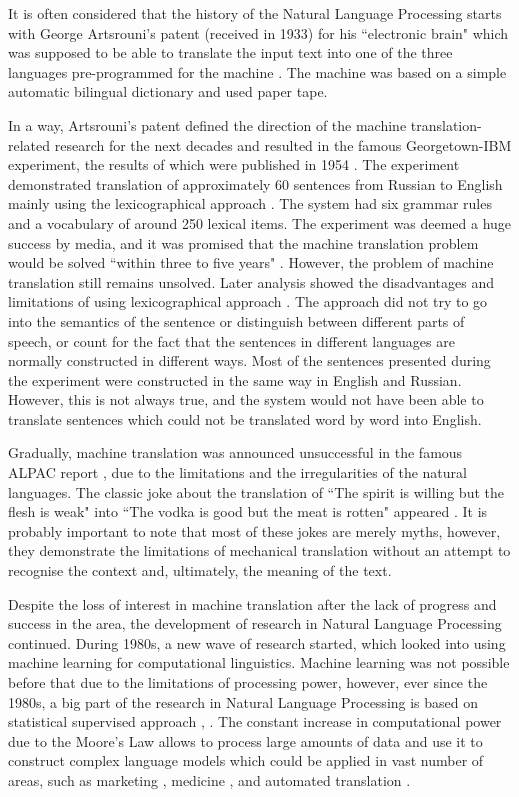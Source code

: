 It is often considered that the history of the Natural Language Processing starts with George Artsrouni's patent (received in 1933) for his ``electronic brain" which was supposed to be able to translate the input text into one of the three languages pre-programmed for the machine \cite{hutchins2004two}. The machine was based on a simple automatic bilingual dictionary and used paper tape. 

In a way, Artsrouni's patent defined the direction of the machine translation-related research for the next decades and resulted in the famous Georgetown-IBM experiment, the results of which were published in 1954 \cite{dostert1955georgetown}. The experiment demonstrated translation of approximately 60 sentences from Russian to English mainly using the lexicographical approach \cite{hutchins2004georgetown}. The system had six grammar rules and a vocabulary of around 250 lexical items. The experiment was deemed a huge success by media, and it was promised that the machine translation problem would be solved ``within three to five years" \cite{plumb1954russian}. However, the problem of machine translation still remains unsolved. Later analysis showed the disadvantages and limitations of using lexicographical approach \cite{garvin1968georgetown}. The approach did not try to go into the semantics of the sentence or distinguish between different parts of speech, or count for the fact that the sentences in different languages are normally constructed in different ways. Most of the sentences presented during the experiment were constructed in the same way in English and Russian. However, this is not always true, and the system would not have been able to translate sentences which could not be translated word by word into English. 

Gradually, machine translation was announced unsuccessful in the famous ALPAC report \cite{national1966language}, due to the limitations and the irregularities of the natural languages. The classic joke about the translation of ``The spirit is willing but the flesh is weak" into ``The vodka is good but the meat is rotten" appeared \cite{hutchins1995whisky}. It is probably important to note that most of these jokes are merely myths, however, they demonstrate the limitations of mechanical translation without an attempt to recognise the context and, ultimately, the meaning of the text.

Despite the loss of interest in machine translation after the lack of progress and success in the area, the development of research in Natural Language Processing continued. During 1980s, a new wave of research started, which looked into using machine learning for computational linguistics. Machine learning was not possible before that due to the limitations of processing power, however, ever since the 1980s, a big part of the research in Natural Language Processing is based on statistical supervised approach \cite{mcqueen1995applying}, \cite{bergsma2010creating}. The constant increase in computational power due to the Moore's Law allows to process large amounts of data and use it to construct complex language models which could be applied in vast number of areas, such as marketing \cite{goldberg1999automated}, medicine \cite{demner2009can}, and automated translation \cite{brants2007large}.


